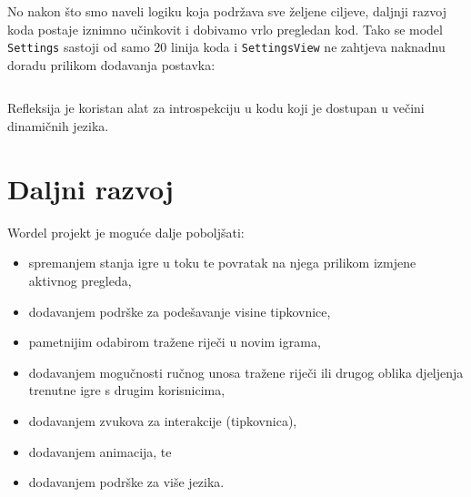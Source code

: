 \documentclass[12pt,a4paper]{report}
\begin{document}
\newpage
No nakon što smo naveli logiku koja podržava sve željene ciljeve, daljnji razvoj
koda postaje iznimno učinkovit i dobivamo vrlo pregledan kod. Tako se model
\verb|Settings| sastoji od samo 20 linija koda i \verb|SettingsView| ne zahtjeva
naknadnu doradu prilikom dodavanja postavka:

\inputminted{cs}{../Wordel/Wordel/Model/Settings.cs}

Refleksija je koristan alat za introspekciju u kodu koji je dostupan u večini
dinamičnih jezika.

\chapter{Daljni razvoj}

Wordel projekt je moguće dalje poboljšati:
\begin{itemize}
    \item spremanjem stanja igre u toku te povratak na njega prilikom izmjene
          aktivnog pregleda,
    \item dodavanjem podrške za podešavanje visine tipkovnice,
    \item pametnijim odabirom tražene riječi u novim igrama,
    \item dodavanjem mogučnosti ručnog unosa tražene riječi ili drugog oblika
          djeljenja trenutne igre s drugim korisnicima,
    \item dodavanjem zvukova za interakcije (tipkovnica),
    \item dodavanjem animacija, te
    \item dodavanjem podrške za više jezika.
\end{itemize}
\end{document}
